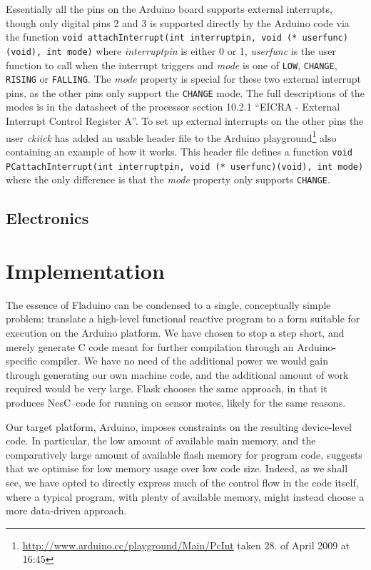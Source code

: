 \documentclass[a4paper,oneside, draft]{memoir}
\begin{document}
Essentially all the pins on the Arduino board supports external
interrupts, though only digital pins 2 and 3 is supported directly by
the Arduino code via the function \texttt{void attachInterrupt(int
  interruptpin, void (* userfunc)(void), int mode)} where
\textit{interruptpin} is either 0 or 1, \textit{userfunc} is the user
function to call when the interrupt triggers and \textit{mode} is one
of \texttt{LOW}, \texttt{CHANGE}, \texttt{RISING} or
\texttt{FALLING}. The \textit{mode} property is special for these two
external interrupt pins, as the other pins only support the
\texttt{CHANGE} mode. The full descriptions of the modes is in the
datasheet of the processor section 10.2.1 ``EICRA - External Interrupt
Control Register A''. To set up external interrupts on the other pins
the user \textit{ckiick} has added an usable header file to the Arduino
playground\footnote{\url{http://www.arduino.cc/playground/Main/PcInt}
  taken 28. of April 2009 at 16:45} also containing an
example of how it works. This header file defines a function
\texttt{void PCattachInterrupt(int interruptpin, void (*
  userfunc)(void), int mode)} where the only difference is that the
\textit{mode} property only supports \texttt{CHANGE}.


\section{Electronics}

\chapter{Implementation}

The essence of Fladuino can be condensed to a single, conceptually
simple problem: translate a high-level functional reactive program to
a form suitable for execution on the Arduino platform.  We have chosen
to stop a step short, and merely generate C code meant for further
compilation through an Arduino-specific compiler.  We have no need of
the additional power we would gain through generating our own machine
code, and the additional amount of work required would be very large.
Flask chooses the same approach, in that it produces NesC--code for
running on sensor motes, likely for the same reasons.

Our target platform, Arduino, imposes constraints on the resulting
device-level code.  In particular, the low amount of available main
memory, and the comparatively large amount of available flash memory
for program code, suggests that we optimise for low memory usage over
low code size.  Indeed, as we shall see, we have opted to directly
express much of the control flow in the code itself, where a typical
program, with plenty of available memory, might instead choose a more
data-driven approach.
\end{document}
